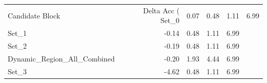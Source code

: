 \begin{tabular}{lrrrr}
\toprule
Candidate Block & Delta Acc (%
\midrule
Set_0 & 0.07 & 0.48 & 1.11 & 6.99 \\
Set_1 & -0.14 & 0.48 & 1.11 & 6.99 \\
Set_2 & -0.19 & 0.48 & 1.11 & 6.99 \\
Dynamic_Region_All_Combined & -0.20 & 1.93 & 4.44 & 6.99 \\
Set_3 & -4.62 & 0.48 & 1.11 & 6.99 \\
\bottomrule
\end{tabular}
